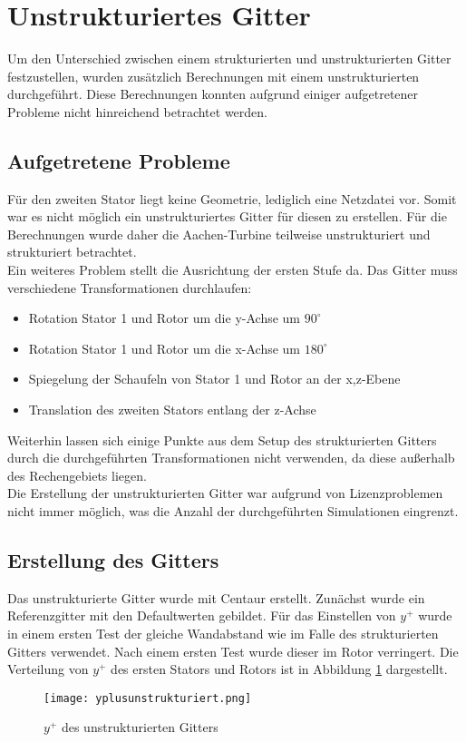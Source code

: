 \section{Unstrukturiertes Gitter}
Um den Unterschied zwischen einem strukturierten und unstrukturierten Gitter festzustellen, wurden zusätzlich Berechnungen mit einem unstrukturierten durchgeführt. Diese Berechnungen konnten aufgrund einiger aufgetretener Probleme nicht hinreichend betrachtet werden.

\subsection{Aufgetretene Probleme}
Für den zweiten Stator liegt keine Geometrie, lediglich eine Netzdatei vor. Somit war es nicht möglich ein unstrukturiertes Gitter für diesen zu erstellen. Für die Berechnungen wurde daher die Aachen-Turbine teilweise unstrukturiert und strukturiert betrachtet.\\
Ein weiteres Problem stellt die Ausrichtung der ersten Stufe da.
Das Gitter muss verschiedene Transformationen durchlaufen:
\begin{itemize}
\item Rotation Stator 1 und Rotor um die y-Achse um $90^\circ$
\item Rotation Stator 1 und Rotor um die x-Achse um $180^\circ$
\item Spiegelung der Schaufeln von Stator 1 und Rotor an der x,z-Ebene
\item Translation des zweiten Stators entlang der z-Achse
\end{itemize}
Weiterhin lassen sich einige Punkte aus dem Setup des strukturierten Gitters durch die durchgeführten Transformationen nicht verwenden, da diese außerhalb des Rechengebiets liegen.\\
Die Erstellung der unstrukturierten Gitter war aufgrund von Lizenzproblemen nicht immer möglich, was die Anzahl der durchgeführten Simulationen eingrenzt.
\subsection{Erstellung des Gitters}
Das unstrukturierte Gitter wurde mit Centaur erstellt. Zunächst wurde ein Referenzgitter mit den Defaultwerten gebildet. Für das Einstellen von $y^+$ wurde in einem ersten Test der gleiche Wandabstand wie im Falle des strukturierten Gitters verwendet. Nach einem ersten Test wurde dieser im Rotor verringert. Die Verteilung von $y^+$ des ersten Stators und Rotors ist in Abbildung \ref{yplusunstrukturiert} dargestellt.
\begin{figure}[htbp]
	\centering
	\texttt{[image: yplusunstrukturiert.png]}
	\caption{$y^+$ des unstrukturierten Gitters} \label{yplusunstrukturiert}
\end{figure}

